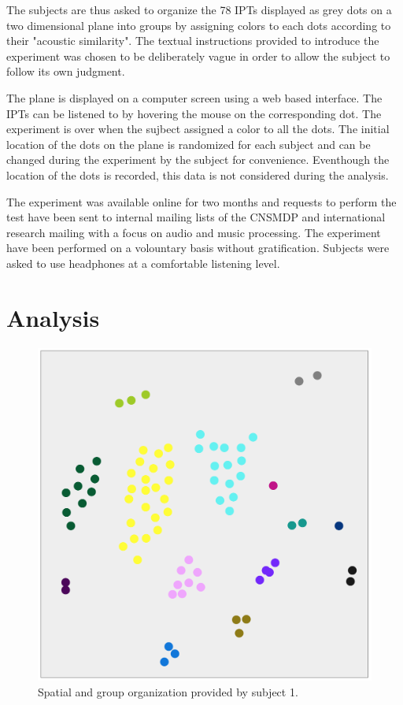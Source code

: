 \documentclass{article}
\newcommand{\ipts}{IPTs\xspace}
\begin{document}
The subjects are thus asked to organize the 78 \ipts displayed as grey dots on a two dimensional plane into groups by assigning colors to each dots according to their "acoustic similarity". The textual instructions provided to introduce the experiment was chosen to be deliberately vague in order to allow the subject to follow its own judgment.

The plane is displayed on a computer screen using a web based interface. The \ipts can be listened to by hovering the mouse on the corresponding dot. The experiment is over when the sujbect assigned a color to all the dots. The initial location of the dots on the plane is randomized for each subject and can be changed during the experiment by the subject for convenience. Eventhough the location of the dots is recorded, this data is not considered during the analysis.

The experiment was available online for two months and requests to perform the test have been sent to internal mailing lists of the CNSMDP and international research mailing with a focus on audio and music processing. The experiment have been performed on a volountary basis without gratification. Subjects were asked to use headphones at a comfortable listening level.

\section{Analysis}\label{sec:analysis}

\begin{figure}
\center
\includegraphics[width = \textwidth]{figures/xp2example.png}
\caption{Spatial and group organization provided by subject 1.}
\label{fig:xp2display}
\end{figure}
\end{document}
